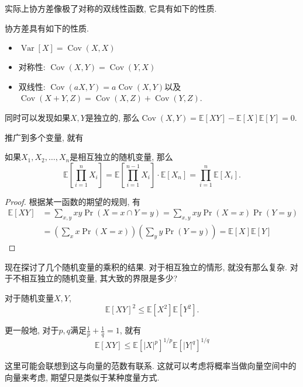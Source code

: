 \documentclass{ctexart}
\begin{document}
实际上协方差像极了对称的双线性函数, 它具有如下的性质. 

\begin{theorem}[协方差的性质] 协方差具有如下的性质.
    \begin{itemize}
        \item $\operatorname{Var}[X]=\operatorname{Cov}(X, X)$
        \item 对称性: $\operatorname{Cov}(X, Y)=\operatorname{Cov}(Y, X)$
        \item 双线性: $\operatorname{Cov}(a X, Y)=a \operatorname{Cov}(X, Y)$以及$\operatorname{Cov}(X+Y, Z)=\operatorname{Cov}(X, Z)+\operatorname{Cov}(Y, Z)$.
    \end{itemize}
\end{theorem}

同时可以发现如果$X, Y$是独立的, 那么$\operatorname{Cov}(X, Y)=\mathbb{E}[X Y]-\mathbb{E}[X] \mathbb{E}[Y]=0$. 

推广到多个变量, 就有
\begin{prop}
    如果$X_1, X_2, \ldots, X_n$是相互独立的随机变量, 那么$$\mathbb{E}\left[\prod_{i=1}^n X_i\right]=\mathbb{E}\left[\prod_{i=1}^{n-1} X_i\right] \cdot \mathbb{E}\left[X_n\right]=\prod_{i=1}^n \mathbb{E}\left[X_i\right].$$
\end{prop}
\begin{proof}
    根据某一函数的期望的规则, 有$$\begin{aligned} \mathbb{E}[X Y] & =\sum_{x, y} x y \operatorname{Pr}(X=x \cap Y=y)=\sum_{x, y} x y \operatorname{Pr}(X=x) \operatorname{Pr}(Y=y) \\ & =\left(\sum_x x \operatorname{Pr}(X=x)\right)\left(\sum_y y \operatorname{Pr}(Y=y)\right)=\mathbb{E}[X] \mathbb{E}[Y]\end{aligned}$$ 
\end{proof}

现在探讨了几个随机变量的乘积的结果. 对于相互独立的情形, 就没有那么复杂. 对于不相互独立的随机变量, 其大致的界限是多少? 

\begin{theorem}
    对于随机变量$X, Y$, $$\mathbb{E}[X Y]^2 \leq \mathbb{E}\left[X^2\right] \mathbb{E}\left[Y^2\right].$$

    更一般地, 对于$p, q$满足$\frac{1}{p}+\frac{1}{q}=1$, 就有$$\mathbb{E}[X Y] \leq \mathbb{E}\left[|X|^p\right]^{1 / p} \mathbb{E}\left[|Y|^q\right]^{1 / q}$$
\end{theorem}

这里可能会联想到这与向量的范数有联系. 这就可以考虑将概率当做向量空间中的向量来考虑, 期望只是类似于某种度量方式. 
\end{document}
